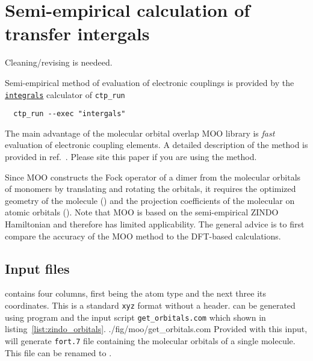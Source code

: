 \section{Semi-empirical calculation of transfer intergals}
\label{sec:moo}

{\color{red} Cleaning/revising is needeed.}

\newcommand{\integrals}{\hyperref[calc:integrals]{\texttt{integrals}}\xspace}
\newcommand{\overlap}{\hyperref[prog:moo_overlap]{\texttt{moo\_overlap}}\xspace}
\newcommand{\moo}{MOO\xspace}

Semi-empirical method of evaluation of electronic couplings is provided by the \integrals calculator of \texttt{ctp\_run} 
\begin{verbatim}
  ctp_run --exec "intergals"
\end{verbatim}

The main advantage of the molecular orbital overlap \moo library is {\em fast} evaluation of electronic coupling elements. A detailed description of the method is provided in ref.~\cite{kirkpatrick_approximate_2008}. Please site this paper if you are using the method.

Since \moo constructs the Fock operator of a dimer from the  molecular orbitals of monomers by translating and rotating the orbitals, it requires the optimized geometry of the molecule (\xyz) and the projection coefficients of the molecular on atomic orbitals (\orb). Note that \moo is based on the semi-empirical ZINDO Hamiltonian and therefore has limited applicability. The general advice is to first compare the accuracy of the \moo method to the DFT-based calculations. 

\subsection{Input files}
\noindent
\xyz contains four columns, first being the atom type and the next three its coordinates. This is a standard \texttt{xyz} format without a header. 
\vskip 0.1cm
\noindent
\orb can be generated using \gaussian program and the input script \texttt{get\_orbitals.com} which shown in listing~\ref{list:zindo_orbitals}.
\vskip 0.1cm
\noindent
%
{./fig/moo/get_orbitals.com}
%
Provided with this input, \gaussian will generate \texttt{fort.7} file containing the molecular orbitals of a single molecule. This file can be renamed to \orb. 

